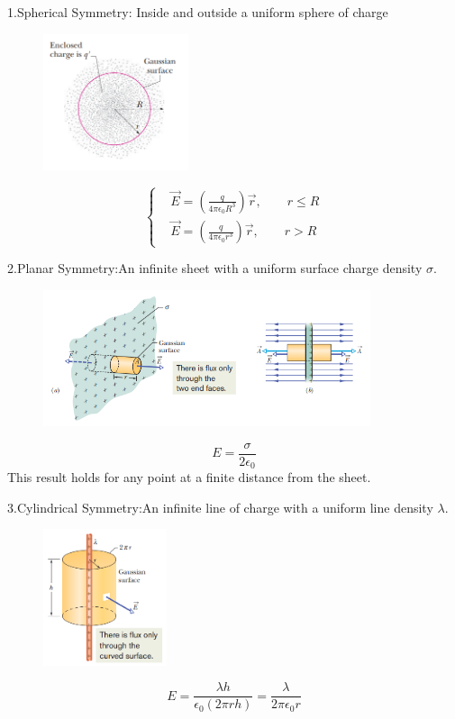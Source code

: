 \documentclass[11pt, a4paper]{article}
\begin{document}
1.Spherical Symmetry: Inside and outside a uniform sphere of charge
\begin{figure}[htbp]
    \centering
    \includegraphics[height = 4cm]{4.png}
\end{figure}
$$\begin{cases}
    &\vec{E}=\left(\frac q{4\pi\epsilon_0R^3}\right)\vec{r} ,\qquad r \le R \\
    &\vec{E} = \left(\frac q{4\pi\epsilon_0r^3}\right)\vec{r},\qquad r > R 
\end{cases}$$

2.Planar Symmetry:An infinite sheet with a uniform surface charge density $\sigma$.
\begin{figure}[htbp]
    \centering
    \includegraphics[height = 4cm]{5.png}
\end{figure}
$$E = \frac{\sigma}{2\epsilon_0}$$  
 This result holds for any point at a finite distance from the sheet.

3.Cylindrical Symmetry:An infinite line of charge with a uniform line density $\lambda$.
\begin{figure}[htbp]
    \centering
    \includegraphics[height = 4cm]{6.png}
\end{figure}
$$E=\frac{\lambda h}{\epsilon_0(2\pi rh)}=\frac\lambda{2\pi\epsilon_0r}$$
\end{document}
